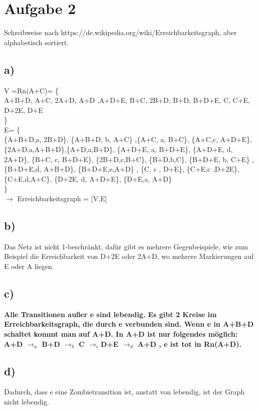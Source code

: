 \documentclass[]{article}
\begin{document}
\section*{Aufgabe 2}
Schreibweise nach https://de.wikipedia.org/wiki/Erreichbarkeitsgraph, aber alphabetisch sortiert.
\subsection*{a)}
V =Rn(A+C)= \{\\A+B+D, A+C, 2A+D, A+D ,A+D+E, B+C, 2B+D, B+D, B+D+E, C, C+E,  D+2E, D+E \\  \}
\\ E= \{\\\{A+B+D,a, 2B+D\}, \{A+B+D, b, A+C\}  ,\{A+C, a, B+C\}, \{A+C,c, A+D+E\}, \{2A+D,a,A+B+D\},\{A+D,a,B+D\}, \{A+D+E, a, B+D+E\}, \{A+D+E, d, 2A+D\}, \{B+C, c, B+D+E\},  \{2B+D,c,B+C\}, \{B+D,b,C\}, \{B+D+E, b, C+E\} , \{B+D+E,d, A+B+D\}, \{B+D+E,e,A+D\} , \{C, c , D+E\}, \{C+E,c ,D+2E\}, \{C+E,d,A+C\}, \{D+2E, d, A+D+E\},   \{D+E,a, A+D\}\\
	\}          		\\
	$\rightarrow$  Erreichbarkeitsgraph = [V,E]
\subsection*{b)} Das Netz ist nicht 1-beschränkt, dafür gibt es mehrere Gegenbeispiele, wie zum Beispiel die Erreichbarkeit von D+2E oder 2A+D, wo mehrere Markierungen auf E oder A liegen.
\subsection*{c)} \textbf{Alle Transitionen außer e sind lebendig. Es gibt 2 Kreise im Erreichbarkeitsgraph, die durch e verbunden sind. Wenn e in A+B+D schaltet kommt man auf A+D. In A+D ist nur folgendes möglich:\\ A+D $\rightarrow_a$ B+D $\rightarrow_b$ C $\rightarrow_c$D+E $\rightarrow_d$ A+D , e ist tot in Rn(A+D). }
\subsection*{d)} Dadurch, dass e eine Zombietransition ist, anstatt von lebendig, ist der Graph nicht lebendig.
\end{document}
